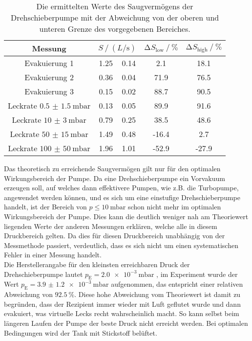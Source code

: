 \begin{table}
    \centering
    \caption{Die ermittelten Werte des Saugvermögens der Drehschieberpumpe mit der Abweichung von der oberen und unteren Grenze des vorgegebenen Bereiches.}
    \label{tab:compare_dreh}
    \begin{tabular}{c  S @{${}\pm{}$} S  S[table-format=2.1] S[table-format=3.1]}
        \toprule
        {Messung} &  & {$\increment S_\text{low} \mathbin{/} \si{\percent}$} & {$\increment S_\text{high} \mathbin{/} \si{\percent}$} \\ 
        \midrule
        Evakuierung 1                       & 1.25 & 0.14 &  2.1 &  18.1\\
        Evakuierung 2                       & 0.36 & 0.04 & 71.9 &  76.5\\
        Evakuierung 3                       & 0.15 & 0.02 & 88.7 &  90.5\\
        Leckrate $\SI{0.5(15)}{\milli\bar}$ & 0.13 & 0.05 & 89.9 &  91.6\\
        Leckrate $\SI{10(3)}{\milli\bar}$   & 0.79 & 0.25 & 38.5 &  48.6\\
        Leckrate $\SI{50(15)}{\milli\bar}$  & 1.49 & 0.48 &-16.4 &   2.7\\
        Leckrate $\SI{100(50)}{\milli\bar}$ & 1.96 & 1.01 &-52.9 & -27.9\\
        \bottomrule
    \end{tabular}
\end{table}

\noindent Das theoretisch zu erreichende Saugvermögen gilt nur für den optimalen Wirkungsbereich der Pumpe. Da eine Drehschieberpumpe ein Vorvakuum erzeugen soll, auf welches dann effektivere Pumpen, 
wie z.B. die Turbopumpe, angewendet werden können, und es sich um eine einstufige Drehschieberpumpe handelt, ist der Bereich von $p \leq \SI{10}{\milli\bar}$ schon nicht mehr im optimalen 
Wirkungsbereich der Pumpe. Dies kann die deutlich weniger nah am Theoriewert liegenden Werte der anderen Messungen erklären, welche alle in diesem Druckbereich gelten. 
Da dies für diesen Druckbereich unabhängig von der Messmethode passiert, verdeutlich, dass es sich nicht um einen systematischen Fehler in einer Messung handelt. \\ 
Die Herstellerangabe für den kleinsten erreichbaren Druck der Drehschieberpumpe lautet $p_\text{E} = \SI{2.0e-3}{\milli\bar}$ \cite{anleitung}, im Experiment wurde der Wert 
$p_\text{E} = \SI{3.9(12)e-3}{\milli\bar}$ aufgenommen, das entspricht einer relativen Abweichung von $\SI{92.5}{\percent}$. Diese hohe Abweichung vom Theoriewert ist damit zu begründen, 
dass der Rezipient immer wieder mit Luft geflutet wurde und dann evakuiert, was virtuelle Lecks recht wahrscheinlich macht. So kann selbst beim längeren Laufen der Pumpe der beste Druck 
nicht erreicht werden. Bei optimalen Bedingungen wird der Tank mit Stickstoff belüftet. 

